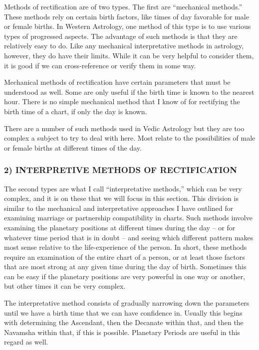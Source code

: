 Methods of rectification are of two types. The first are “mechanical methods.” These methods rely on certain birth factors, like times of day favorable for male or female births. In Western Astrology, one method of this type is to use various types of progressed aspects. The advantage of such methods is that they are relatively easy to do. Like any mechanical interpretative methods in astrology, however, they do have their limits. While it can be very helpful to consider them, it is good if we can cross-reference or verify them in some way.

 

Mechanical methods of rectification have certain parameters that must be understood as well. Some are only useful if the birth time is known to the nearest hour. There is no simple mechanical method that I know of for rectifying the birth time of a chart, if only the day is known.

 

There are a number of such methods used in Vedic Astrology but they are too complex a subject to try to deal with here. Most relate to the possibilities of male or female births at different times of the day.

 

\subsubsection{2) INTERPRETIVE METHODS OF RECTIFICATION}
 

The second types are what I call “interpretative methods,” which can be very complex, and it is on these that we will focus in this section. This division is similar to the mechanical and interpretative approaches I have outlined for examining marriage or partnership compatibility in charts. Such methods involve examining the planetary positions at different times during the day – or for whatever time period that is in doubt – and seeing which different pattern makes most sense relative to the life-experience of the person. In short, these methods require an examination of the entire chart of a person, or at least those factors that are most strong at any given time during the day of birth. Sometimes this can be easy if the planetary positions are very powerful in one way or another, but other times it can be very complex.

 

The interpretative method consists of gradually narrowing down the parameters until we have a birth time that we can have confidence in. Usually this begins with determining the Ascendant, then the Decanate within that, and then the Navamsha within that, if this is possible. Planetary Periods are useful in this regard as well.


